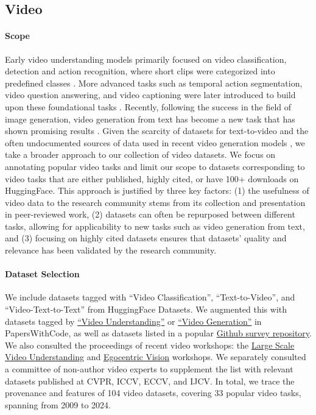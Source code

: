\vspace{-2mm}
\subsection{Video} 
\vspace{-2mm}
\paragraph{Scope}
Early video understanding models primarily focused on video classification, detection and action recognition, where short clips were categorized into predefined classes \citep{video_obj_survey,zhu2020comprehensivestudydeepvideo}. More advanced tasks such as temporal action segmentation, video question answering, and video captioning were later introduced to build upon these foundational tasks \citep{moctezuma2022videocaptioningcomparativereview, zhu2023deeplearningvideotextretrieval}. Recently, following the success in the field of image generation, video generation from text has become a new task that has shown promising results \citep{sora2024,opensora, blattmann2023stablevideodiffusionscaling, esser2023structurecontentguidedvideosynthesis}. Given the scarcity of datasets for text-to-video and the often undocumented sources of data used in recent video generation models \citep{MauranOpenAI}, we take a broader approach to our collection of video datasets. We focus on annotating popular video tasks and limit our scope to datasets corresponding to video tasks that are either published, highly cited, or have 100+ downloads on HuggingFace. This approach is justified by three key factors: (1) the usefulness of video data to the research community stems from its collection and presentation in peer-reviewed work, (2) datasets can often be repurposed between different tasks, allowing for applicability to new tasks such as video generation from text, and (3) focusing on highly cited datasets ensures that datasets' quality and relevance has been validated by the research community.

\vspace{-2mm}
\paragraph{Dataset Selection} We include datasets tagged with ``Video Classification'', ``Text-to-Video'', and ``Video-Text-to-Text'' from HuggingFace Datasets.
We augmented this with datasets tagged by \href{https://paperswithcode.com/task/video-understanding}{``Video Understanding''} or \href{https://paperswithcode.com/task/video-generation}{``Video Generation''} in PapersWithCode, as well as datasets listed in a popular \href{https://github.com/xiaobai1217/Awesome-Video-Datasets}{Github survey repository}.
We also consulted the proceedings of recent video workshops: the \href{https://holistic-video-understanding.github.io/}{Large Scale Video Understanding} and \href{https://egovis.github.io/cvpr24/}{Egocentric Vision} workshops.
We separately consulted a committee of non-author video experts to supplement the list with relevant datasets published at CVPR, ICCV, ECCV, and IJCV. 
In total, we trace the provenance and features of 104 video datasets, covering 33 popular video tasks, spanning from 2009 to 2024.